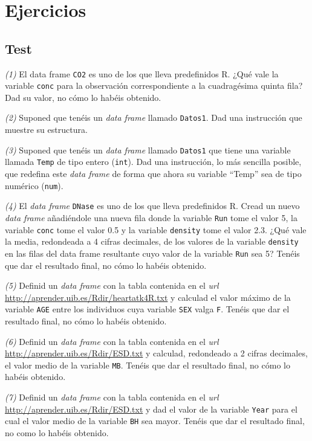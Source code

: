 \documentclass[]{book}
\theoremstyle{definition}
\theoremstyle{definition}
\theoremstyle{definition}
\theoremstyle{remark}
\begin{document}
\hypertarget{ejercicios-4}{%
\section{Ejercicios}\label{ejercicios-4}}

\hypertarget{test-3}{%
\subsection*{Test}\label{test-3}}

\emph{(1)} El data frame \texttt{CO2} es uno de los que lleva predefinidos R. ¿Qué vale la variable \texttt{conc} para la observación correspondiente a la cuadragésima quinta fila? Dad su valor, no cómo lo habéis obtenido.

\emph{(2)} Suponed que tenéis un \emph{data frame} llamado \texttt{Datos1}. Dad una instrucción que muestre su estructura.

\emph{(3)} Suponed que tenéis un \emph{data frame} llamado \texttt{Datos1} que tiene una variable llamada \texttt{Temp} de tipo entero (\texttt{int}). Dad una instrucción, lo más sencilla posible, que redefina este \emph{data frame} de forma que ahora su variable ``Temp'' sea de tipo numérico (\texttt{num}).

\emph{(4)} El \emph{data frame} \texttt{DNase} es uno de los que lleva predefinidos R. Cread un nuevo \emph{data frame} añadiéndole una nueva fila donde la variable \texttt{Run} tome el valor 5, la variable \texttt{conc} tome el valor 0.5 y la variable \texttt{density} tome el valor 2.3. ¿Qué vale la media, redondeada a 4 cifras decimales, de los valores de la variable \texttt{density} en las filas del data frame resultante cuyo valor de la variable \texttt{Run} sea 5? Tenéis que dar el resultado final, no cómo lo habéis obtenido.

\emph{(5)} Definid un \emph{data frame} con la tabla contenida en el \emph{url} \url{http://aprender.uib.es/Rdir/heartatk4R.txt} y calculad el valor máximo de la variable \texttt{AGE} entre los individuos cuya variable \texttt{SEX} valga \texttt{F}. Tenéis que dar el resultado final, no cómo lo habéis obtenido.

\emph{(6)} Definid un \emph{data frame} con la tabla contenida en el \emph{url} \url{http://aprender.uib.es/Rdir/ESD.txt} y calculad, redondeado a 2 cifras decimales, el valor medio de la variable \texttt{MB}. Tenéis que dar el resultado final, no cómo lo habéis obtenido.

\emph{(7)} Definid un \emph{data frame} con la tabla contenida en el \emph{url} \url{http://aprender.uib.es/Rdir/ESD.txt} y dad el valor de la variable \texttt{Year} para el cual el valor medio de la variable \texttt{BH} sea mayor. Tenéis que dar el resultado final, no como lo habéis obtenido.
\end{document}
